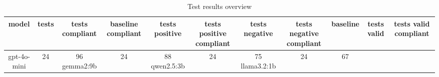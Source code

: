 
  \begin{table}[h!]
  \centering
  \begin{tabular}{|c|c|c|c|c|c|c|c|c|c|c|}
  \hline
  model & tests & tests compliant & baseline compliant & tests positive & tests positive compliant & tests negative & tests negative compliant & baseline & tests valid & tests valid compliant \\
  \hline
  gpt-4o-mini & 24 & 96%
\hline
gemma2:9b & 24 & 88%
\hline
qwen2.5:3b & 24 & 75%
\hline
llama3.2:1b & 24 & 67%
  \end{tabular}
  \caption{Test results overview}
  
  \end{table}
  